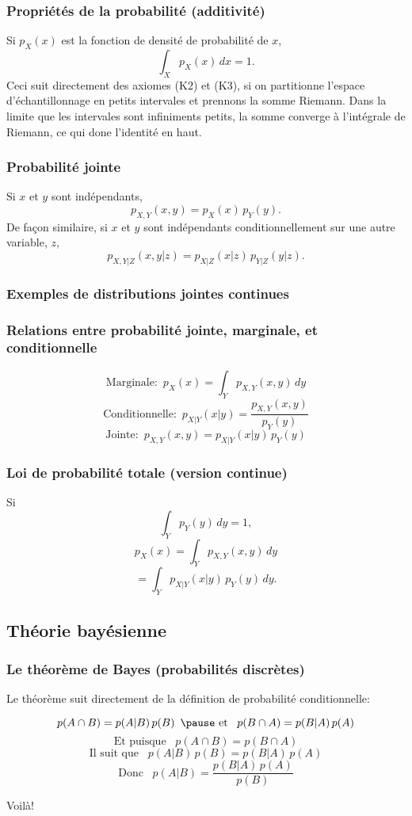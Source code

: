 \documentclass{beamer}
\begin{document}
\begin{frame}
    \frametitle{Propriétés de la probabilité (additivité)}
    Si $p_X(x)$ est la fonction de densité de probabilité de $x$,
    \[\int_X p_X(x) \, dx = 1.\]
    \vfill
    \pause
    Ceci suit directement des axiomes (K2) et (K3), si on partitionne l'espace d'échantillonnage
    en petits intervales et prennons la somme Riemann. Dans la limite que les intervales sont infiniments
    petits, la somme converge à l'intégrale de Riemann, ce qui done l'identité en haut.
\end{frame}


\begin{frame}
    \frametitle{Probabilité jointe}
    Si $x$ et $y$ sont indépendants,
    \[p_{X,Y}(x,y) = p_X(x) \, p_Y(y).\]
    \pause
    De façon similaire, si $x$ et $y$ sont indépendants
    conditionnellement sur une autre variable, $z$,
    \[p_{X,Y|Z}(x,y|z) = p_{X|Z}(x|z) \, p_{Y|Z}(y|z).\]
\end{frame}


\begin{frame}
    \frametitle{Exemples de distributions jointes continues}
\end{frame}


\begin{frame}
    \frametitle{Relations entre probabilité jointe, marginale, et conditionnelle}
    \[\textrm{Marginale:} \, \, \, p_X(x) = \int_Y p_{X,Y}(x,y) \, dy\]
    \pause
    \[\textrm{Conditionnelle:} \, \, \, p_{X|Y}(x|y) = \frac{p_{X,Y}(x,y)}{p_Y(y)}\]
    \pause
    \[\textrm{Jointe:} \, \, \, p_{X,Y}(x,y) = p_{X|Y}(x|y) \, p_Y(y)\]
\end{frame}


\begin{frame}
    \frametitle{Loi de probabilité totale (version continue)}
    Si
    \[\int_Y p_Y(y) \, dy = 1,\]
    \pause
    \[p_X(x) = \int_{Y} p_{X,Y}(x, y) \, dy\]
    \pause
    \[= \int_{Y} p_{X|Y}(x | y) \, p_Y(y) \, dy.\]
\end{frame}



\subsection{Théorie bayésienne}

\begin{frame}
    \frametitle{Le théorème de Bayes (probabilités discrètes)}
    Le théorème suit directement de la définition de probabilité conditionnelle:

    \pause

    \[p(A \cap B) =  p(A | B) \, p(B) \,\,\, \pause \textrm{ et } \,\,\, p(B \cap A) =  p(B | A) \, p(A)\]
    \pause
    \[\textrm{Et puisque } \,\,\, p(A \cap B) = p(B \cap A)\]
    \pause
    \[\textrm{Il suit que } \,\,\, p(A | B) \, p(B) = p(B | A) \, p(A)\]
    \pause
    \[\textrm{Donc } \,\,\, p(A | B) = \frac{p(B | A) \, p(A)}{p(B)}\]
    
    Voilà!
\end{frame}
\end{document}
